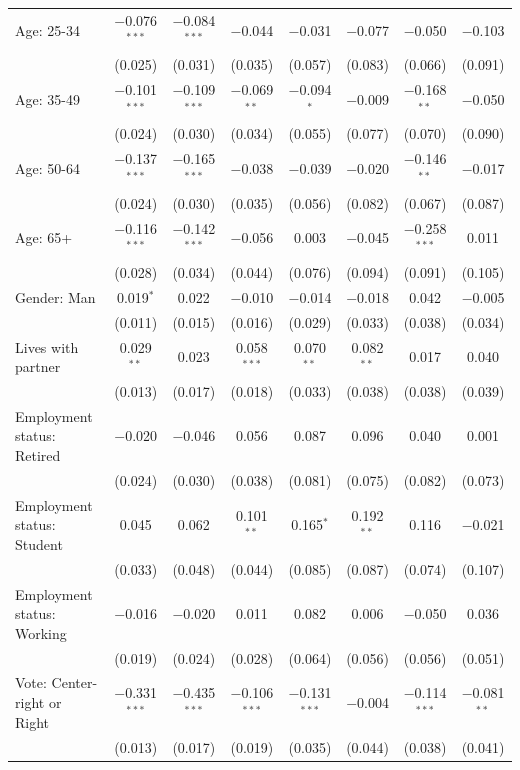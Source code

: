 \documentclass[12pt,english]{article}
\begin{document}
\begin{table}[h]
{{\begin{tabular}{@{\extracolsep{5pt}}lccccccc}
  Age: 25-34 & $-$0.076$^{***}$ & $-$0.084$^{***}$ & $-$0.044 & $-$0.031 & $-$0.077 & $-$0.050 & $-$0.103 \\ 
  & (0.025) & (0.031) & (0.035) & (0.057) & (0.083) & (0.066) & (0.091) \\ 
  Age: 35-49 & $-$0.101$^{***}$ & $-$0.109$^{***}$ & $-$0.069$^{**}$ & $-$0.094$^{*}$ & $-$0.009 & $-$0.168$^{**}$ & $-$0.050 \\ 
  & (0.024) & (0.030) & (0.034) & (0.055) & (0.077) & (0.070) & (0.090) \\ 
  Age: 50-64 & $-$0.137$^{***}$ & $-$0.165$^{***}$ & $-$0.038 & $-$0.039 & $-$0.020 & $-$0.146$^{**}$ & $-$0.017 \\ 
  & (0.024) & (0.030) & (0.035) & (0.056) & (0.082) & (0.067) & (0.087) \\ 
  Age: 65+ & $-$0.116$^{***}$ & $-$0.142$^{***}$ & $-$0.056 & 0.003 & $-$0.045 & $-$0.258$^{***}$ & 0.011 \\ 
  & (0.028) & (0.034) & (0.044) & (0.076) & (0.094) & (0.091) & (0.105) \\ 
  Gender: Man & 0.019$^{*}$ & 0.022 & $-$0.010 & $-$0.014 & $-$0.018 & 0.042 & $-$0.005 \\ 
  & (0.011) & (0.015) & (0.016) & (0.029) & (0.033) & (0.038) & (0.034) \\ 
  Lives with partner & 0.029$^{**}$ & 0.023 & 0.058$^{***}$ & 0.070$^{**}$ & 0.082$^{**}$ & 0.017 & 0.040 \\ 
  & (0.013) & (0.017) & (0.018) & (0.033) & (0.038) & (0.038) & (0.039) \\ 
  Employment status: Retired & $-$0.020 & $-$0.046 & 0.056 & 0.087 & 0.096 & 0.040 & 0.001 \\ 
  & (0.024) & (0.030) & (0.038) & (0.081) & (0.075) & (0.082) & (0.073) \\ 
  Employment status: Student & 0.045 & 0.062 & 0.101$^{**}$ & 0.165$^{*}$ & 0.192$^{**}$ & 0.116 & $-$0.021 \\ 
  & (0.033) & (0.048) & (0.044) & (0.085) & (0.087) & (0.074) & (0.107) \\ 
  Employment status: Working & $-$0.016 & $-$0.020 & 0.011 & 0.082 & 0.006 & $-$0.050 & 0.036 \\ 
  & (0.019) & (0.024) & (0.028) & (0.064) & (0.056) & (0.056) & (0.051) \\ 
  Vote: Center-right or Right & $-$0.331$^{***}$ & $-$0.435$^{***}$ & $-$0.106$^{***}$ & $-$0.131$^{***}$ & $-$0.004 & $-$0.114$^{***}$ & $-$0.081$^{**}$ \\ 
  & (0.013) & (0.017) & (0.019) & (0.035) & (0.044) & (0.038) & (0.041) \\ 

\end{tabular}}}
\end{table}
\end{document}
